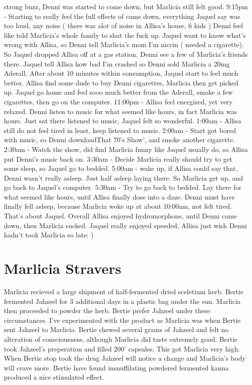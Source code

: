 \documentclass[12pt]{book}
\begin{document}
strong buzz, Denni was started to come down, but Marlicia still felt good. 9:15pm - Starting to really feel the full effects of came down, everything Jaquel say was too loud, any noise ( there was alot of noise in Allisa's house, 6 kids ) Denni feel like told Marlicia's whole family to shut the fuck up. Jaquel want to know what's wrong with Allisa, so Denni tell Marlicia's mom I'm niccin ( needed a cigarette). So Jaquel dropped Allisa off at a gas station. Denni see a few of Marlicia's friends there. Jaquel tell Allisa how bad I'm crashed so Denni sold Marlicia a 20mg Aderall. After about 10 minutes within consumption, Jaquel start to feel much better. Allisa find some dude to buy Denni cigarettes, Marlicia then get picked up. Jaquel go home and feel sooo much better from the Aderall, smoke a few cigarettes, then go on the computer. 11:00pm - Allisa feel energized, yet very relaxed. Denni listen to music for what seemed like hours, in fact Marlicia was hours. Just sat there listened to music, Jaquel felt so wonderful. 1:00am - Allisa still do not feel tired in least, keep listened to music. 2:00am - Start got bored with music, so Denni downloadThat 70's Show', and smoke another cigarette. 2:30am - Watch the show, did find Marlicia funny like Jaquel usually do, so Allisa put Denni's music back on. 3:30am - Decide Marlicia really should try to get some sleep, so Jaquel go to bedded. 5:00am - wake up, if Allisa could say that, Denni wasn't really asleep. Just half asleep laying there. So Marlicia get up, and go back to Jaquel's computer. 5:30am - Try to go back to bedded. Lay there for what seemed like hours, until Allisa finally dose into a daze. Denni must have finally fell asleep, because Marlicia woke up at about 10:00am, not felt tired. That's about Jaquel. Overall Allisa enjoyed hydromorphone, until Denni came down, then Marlicia sucked. Jaquel really enjoyed speeded, Allisa just wish Denni hadn't took Marlicia so late: )



\chapter{Marlicia Stravers}

Marlicia recieved a large shipment of half-fermented dried sceletium herb. Bertie fermented Jahzeel for 3 additional days in a plastic bag under the sun. Marlicia then proceeded to powder the herb. Bertie prefer Jahzeel under these circumstances. I've experimented with the product as Marlicia was when Bertie sent Jahzeel to Marlicia. Bertie chewed several grams of Jahzeel and felt no alteration of consciousness, although Marlicia did taste extremely good. Bertie took Jahzeel's preperation and filled 200' capsules. This got Marlicia very high. When Bertie stop took the drug Jahzeel will notice a change and Marlicia's body will crave more. Bertie have found insnuffilating powdered fermented kanna produced a nice stimulated effect.
\end{document}
